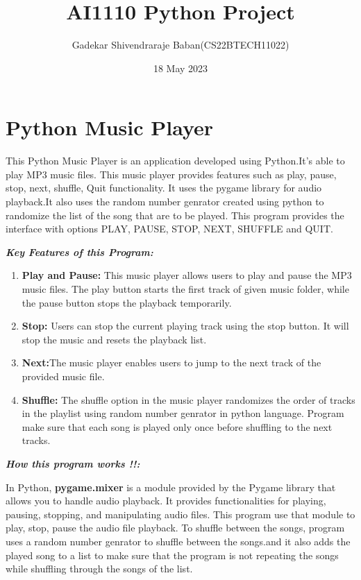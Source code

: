 \documentclass{article}
\title{AI1110 Python Project}
\author{Gadekar Shivendraraje Baban(CS22BTECH11022)}
\date{ 18 May 2023}
\begin{document}
\maketitle

\section*{\textbf{Python Music Player}}


This Python Music Player is an application developed using Python.It's able to play  MP3 music files. This music player provides features such as play, pause, stop, next, shuffle, Quit functionality. It uses the pygame library for audio playback.It also uses the random number genrator created using python to randomize the list of the song that are to be played. This program provides the interface with options PLAY, PAUSE, STOP, NEXT, SHUFFLE and  QUIT.

\begin{flushleft}\textit{\textbf{Key Features of this Program:}}\end{flushleft}
\begin{enumerate}


\item \textbf{Play and Pause:} This music player allows users to play and pause the  MP3 music files. The 
 play button starts the first track of given music folder, while the pause button stops the playback temporarily.

\item \textbf{Stop:} Users can stop the current playing track using the stop button. It will stop the music and resets the playback list.

\item \textbf{Next:}The music player enables users to jump to the next track of the provided music file.

\item \textbf{Shuffle:} The shuffle option in the music player randomizes the order of tracks in the playlist using random number genrator in python language. Program make sure that each song is played only once before shuffling to the next tracks.
\end{enumerate}
\textit{\textbf{How this program works !!:}}



In Python, \textbf{pygame.mixer} is a module provided by the Pygame library that allows you to handle audio playback. It provides functionalities for playing, pausing, stopping, and manipulating audio files.
This program use that module to play, stop, pause the audio file playback.
To shuffle between the songs, program uses a random number genrator to shuffle between the songs.and it also adds the played song to a list to make sure that the program is not repeating the songs while shuffling through the songs of the list.
\end{document}
